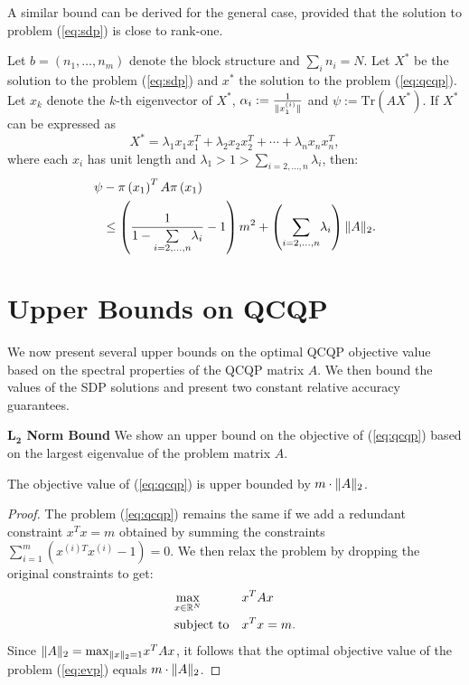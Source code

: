 A similar bound can be derived for the general case, provided that the solution to problem (\ref{eq:sdp}) is close to rank-one.
\begin{proposition}
Let $b = \left(n_1,\ldots,n_m\right)$ denote the block structure and $ \sum_i n_i = N $.
Let $X^*$ be the solution to the problem (\ref{eq:sdp}) and $x^{*}$ the solution to the problem (\ref{eq:qcqp}).
Let $x_k$ denote the $k$-th eigenvector of $X^*$,
$\alpha_i := \frac{1}{\lVert x_1^{(i)}\rVert}$ and
$\psi := \mathrm{Tr}\left(A X^{*}\right)$.
If $X^*$ can be expressed as
$$X^* = \lambda_1  x_1 x_1^T + \lambda_2 x_2 x_2^T + \cdots + \lambda_n x_n x_n^T,$$
where each $x_i$ has unit length and $\lambda_1 > 1 >  \underset{i=2,\ldots, n}{\sum} \lambda_i$,
 then:
\begin{align*}
\psi &- \pi\left(x_1\right)^T A \pi\left(x_1\right) \\ &\leq  \left(\frac{1}{1- \underset{i=2,\ldots, n}{\sum} \lambda_i} -1\right)  m^2 + \left(\underset{i=2,\ldots, n}{\sum} \lambda_i\right) \lVert A\rVert_2.
\end{align*}
\end{proposition}

\section{Upper Bounds on QCQP}\label{chap:relaxations:upperbounds}
We now present several upper bounds on the optimal QCQP objective
value based on the spectral properties of the QCQP matrix $A$. We then bound the
values of the SDP solutions and present two constant relative accuracy
guarantees.

\noindent\textbf{$\mathbf{L_2}$ Norm Bound}
We show an  upper bound on the objective of (\ref{eq:qcqp}) based on the largest eigenvalue
of the problem matrix $A$.

\begin{proposition}
The objective value of (\ref{eq:qcqp}) is upper bounded by $m \cdot \lVert A\rVert_2$.
\end{proposition}
\begin{proof}
The problem (\ref{eq:qcqp}) remains the same if we add a redundant constraint $x^T x = m$
obtained by summing the constraints $\sum_{i= 1}^{m} \left(x^{(i)T}x^{(i)} - 1\right) = 0$.
We then relax the problem by dropping the original constraints to get:
\begin{equation}\label{eq:evp}
\begin{aligned}
& \underset{x \in \mathbb{R}^{N}}{\text{max}}
& & x^T A x\\
& \text{subject to}
& &x^{T} x = m.
\end{aligned}
\end{equation}
Since $\lVert A\rVert_2 = \text{max}_{\lVert x\rVert_2 = 1} x^T A x$, it follows that the optimal
objective value of the problem (\ref{eq:evp}) equals $m \cdot \lVert A\rVert_2 $.
\end{proof}

